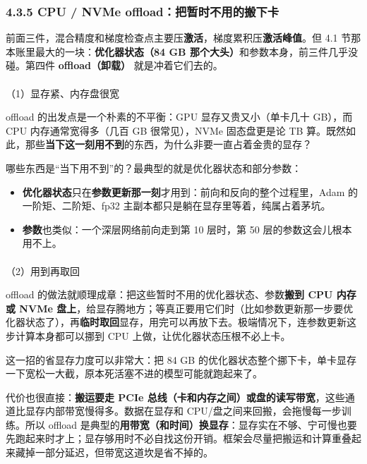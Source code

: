 \documentclass[
  chinese,
]{ctexart}
\makeatletter
\let\oldparagraph\paragraph
\renewcommand{\paragraph}{
    \@ifstar
      \xxxParagraphStar
      \xxxParagraphNoStar
  }
\newcommand{\xxxParagraphStar}[1]{\oldparagraph*{#1}\mbox{}}
\newcommand{\xxxParagraphNoStar}[1]{\oldparagraph{#1}\mbox{}}
\providecommand{\tightlist}{%
  \setlength{\itemsep}{0pt}\setlength{\parskip}{0pt}}
\makeatother
\begin{document}
\subsubsection{4.3.5 CPU / NVMe
offload：把暂时不用的搬下卡}\label{cpu-nvme-offloadux628aux6682ux65f6ux4e0dux7528ux7684ux642cux4e0bux5361}

前面三件，混合精度和梯度检查点主要压\textbf{激活}，梯度累积压\textbf{激活峰值}。但
4.1 节那本账里最大的一块：\textbf{优化器状态（84 GB
那个大头）}和参数本身，前三件几乎没碰。第四件 \textbf{offload（卸载）}
就是冲着它们去的。

\paragraph{（1）显存紧、内存盘很宽}\label{ux663eux5b58ux7d27ux5185ux5b58ux76d8ux5f88ux5bbd}

offload 的出发点是一个朴素的不平衡：GPU 显存又贵又小（单卡几十 GB），而
CPU 内存通常宽得多（几百 GB 很常见），NVMe 固态盘更是论 TB
算。既然如此，那些\textbf{当下这一刻用不到}的东西，为什么非要一直占着金贵的显存？

哪些东西是``当下用不到''的？最典型的就是优化器状态和部分参数：

\begin{itemize}
\tightlist
\item
  \textbf{优化器状态}只在\textbf{参数更新那一刻}才用到：前向和反向的整个过程里，Adam
  的一阶矩、二阶矩、fp32 主副本都只是躺在显存里等着，纯属占着茅坑。
\item
  \textbf{参数}也类似：一个深层网络前向走到第 10 层时，第 50
  层的参数这会儿根本用不上。
\end{itemize}

\paragraph{（2）用到再取回}\label{ux7528ux5230ux518dux53d6ux56de}

offload 的做法就顺理成章：把这些暂时不用的优化器状态、参数\textbf{搬到
CPU 内存或 NVMe
盘上}，给显存腾地方；等真正要用它们时（比如参数更新那一步要优化器状态了），再\textbf{临时取回}显存，用完可以再放下去。极端情况下，连参数更新这步计算本身都可以挪到
CPU 上做，让优化器状态压根不必上卡。

这一招的省显存力度可以非常大：把 84 GB
的优化器状态整个挪下卡，单卡显存一下宽松一大截，原本死活塞不进的模型可能就跑起来了。

代价也很直接：\textbf{搬运要走 PCIe
总线（卡和内存之间）或盘的读写带宽}，这些通道比显存内部带宽慢得多。数据在显存和
CPU/盘之间来回搬，会拖慢每一步训练。所以 offload
是典型的\textbf{用带宽（和时间）换显存}：显存实在不够、宁可慢也要先跑起来时才上；显存够用时不必自找这份开销。框架会尽量把搬运和计算重叠起来藏掉一部分延迟，但带宽这道坎是省不掉的。
\end{document}

